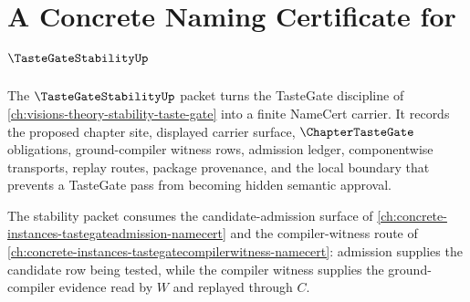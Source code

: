 \chapter{A Concrete Naming Certificate for $\TasteGateStabilityUp$}
\label{ch:concrete-instances-tastegatestability-namecert}

The $\TasteGateStabilityUp$ packet turns the TasteGate discipline of \autoref{ch:visions-theory-stability-taste-gate} into a finite NameCert carrier. It records the proposed chapter site, displayed carrier surface, $\ChapterTasteGate$ obligations, ground-compiler witness rows, admission ledger, componentwise transports, replay routes, package provenance, and the local boundary that prevents a TasteGate pass from becoming hidden semantic approval.

The stability packet consumes the candidate-admission surface of \autoref{ch:concrete-instances-tastegateadmission-namecert} and the compiler-witness route of \autoref{ch:concrete-instances-tastegatecompilerwitness-namecert}: admission supplies the candidate row being tested, while the compiler witness supplies the ground-compiler evidence read by $W$ and replayed through $C$.

